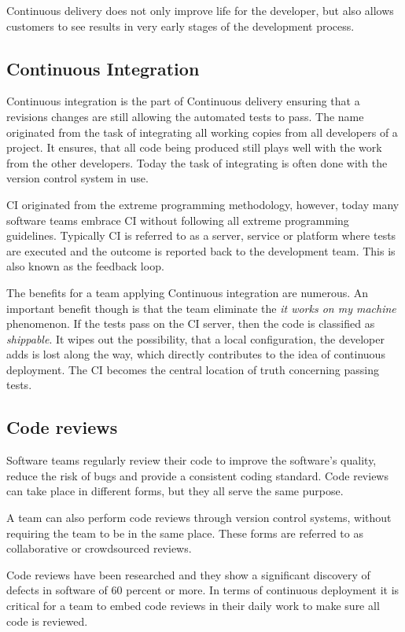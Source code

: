 Continuous delivery does not only improve life for the developer, but also
allows customers to see results in very early stages of the development
process.

\subsection{Continuous Integration}

Continuous integration is the part of Continuous delivery ensuring that a
revisions changes are still allowing the automated tests to pass. The name
originated from the task of integrating all working copies from all developers
of a project. It ensures, that all code being produced still plays well with
the work from the other developers. Today the task of integrating is often done
with the version control system in use.

CI originated from the extreme programming methodology, however, today many
software teams embrace CI without following all extreme programming guidelines.
Typically CI is referred to as a server, service or platform where tests are
executed and the outcome is reported back to the development team. This is also
known as the feedback loop.

The benefits for a team applying Continuous integration are numerous. An important
benefit though is that the team eliminate the \textit{it works on my machine}
phenomenon. If the tests pass on the CI server, then the code is classified as
\textit{shippable}. It wipes out the possibility, that a local configuration,
the developer adds is lost along the way, which directly contributes to the
idea of continuous deployment. The CI becomes the central location of truth
concerning passing tests.

\subsection{Code reviews}

Software teams regularly review their code to improve the software's quality,
reduce the risk of bugs and provide a consistent coding standard. Code reviews
can take place in different forms, but they all serve the same purpose.

A team can also perform code reviews through version control systems, without
requiring the team to be in the same place. These forms are referred to as
collaborative or crowdsourced reviews.

Code reviews have been researched and they show a significant discovery of
defects in software of 60 percent or more. In terms of continuous deployment it
is critical for a team to embed code reviews in their daily work to make sure
all code is reviewed. \cite{code_reviews}

